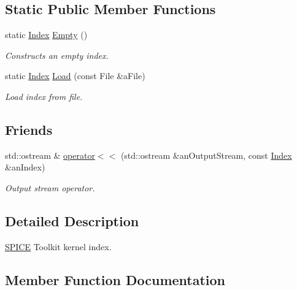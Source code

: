 \subsection*{Static Public Member Functions}
\begin{DoxyCompactItemize}
\item 
static \hyperlink{classostk_1_1physics_1_1env_1_1ephem_1_1spice_1_1_index}{Index} \hyperlink{classostk_1_1physics_1_1env_1_1ephem_1_1spice_1_1_index_ac6afccc60da38e217e01f83b9f1c8d7a}{Empty} ()
\begin{DoxyCompactList}\small\item\em Constructs an empty index. \end{DoxyCompactList}\item 
static \hyperlink{classostk_1_1physics_1_1env_1_1ephem_1_1spice_1_1_index}{Index} \hyperlink{classostk_1_1physics_1_1env_1_1ephem_1_1spice_1_1_index_a73345e080ebf9a86f3447c5049892925}{Load} (const File \&a\+File)
\begin{DoxyCompactList}\small\item\em Load index from file. \end{DoxyCompactList}\end{DoxyCompactItemize}
\subsection*{Friends}
\begin{DoxyCompactItemize}
\item 
std\+::ostream \& \hyperlink{classostk_1_1physics_1_1env_1_1ephem_1_1spice_1_1_index_a1cdcc2b37f330da2f47a459f6225e98d}{operator$<$$<$} (std\+::ostream \&an\+Output\+Stream, const \hyperlink{classostk_1_1physics_1_1env_1_1ephem_1_1spice_1_1_index}{Index} \&an\+Index)
\begin{DoxyCompactList}\small\item\em Output stream operator. \end{DoxyCompactList}\end{DoxyCompactItemize}


\subsection{Detailed Description}
\hyperlink{classostk_1_1physics_1_1env_1_1ephem_1_1_s_p_i_c_e}{S\+P\+I\+CE} Toolkit kernel index. 

\subsection{Member Function Documentation}
\mbox{\label{classostk_1_1physics_1_1env_1_1ephem_1_1spice_1_1_index_ac6afccc60da38e217e01f83b9f1c8d7a}} 
